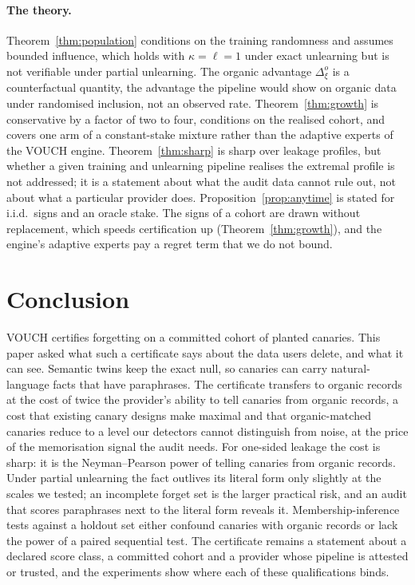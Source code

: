 \paragraph{The theory.} Theorem~\ref{thm:population} conditions on the training randomness
and assumes bounded influence, which holds with $\kappa=\ell=1$ under exact unlearning but
is not verifiable under partial unlearning. The organic advantage $\Delta^o_\xi$ is a
counterfactual quantity, the advantage the pipeline would show on organic data under
randomised inclusion, not an observed rate. Theorem~\ref{thm:growth} is conservative by a
factor of two to four, conditions on the realised cohort, and covers one arm of a
constant-stake mixture rather than the adaptive experts of the VOUCH engine.
Theorem~\ref{thm:sharp} is sharp over leakage profiles, but whether a given training and
unlearning pipeline realises the extremal profile is not addressed; it is a statement about
what the audit data cannot rule out, not about what a particular provider does.
Proposition~\ref{prop:anytime} is stated for i.i.d.\ signs and an oracle stake. The signs of
a cohort are drawn without replacement, which speeds certification up
(Theorem~\ref{thm:growth}), and the engine's adaptive experts pay a regret term that we do
not bound.

\section{Conclusion}\label{sec:conclusion}

VOUCH certifies forgetting on a committed cohort of planted canaries. This paper asked what
such a certificate says about the data users delete, and what it can see. Semantic twins
keep the exact null, so canaries can carry natural-language facts that have paraphrases.
The certificate transfers to organic records at the cost of twice the provider's ability
to tell canaries from organic records, a cost that existing canary designs make maximal
and that organic-matched canaries reduce to a level our detectors cannot distinguish from
noise, at the price of the memorisation signal the audit needs. For one-sided leakage the
cost is sharp: it is the Neyman--Pearson power of telling canaries from organic records. Under partial unlearning the fact outlives its literal form only slightly at
the scales we tested; an incomplete forget set is the larger practical risk, and an audit
that scores paraphrases next to the literal form reveals it. Membership-inference tests
against a holdout set either confound canaries with organic records or lack the power of
a paired sequential test. The certificate remains a statement about a declared score
class, a committed cohort and a provider whose pipeline is attested or trusted, and the
experiments show where each of these qualifications binds.
